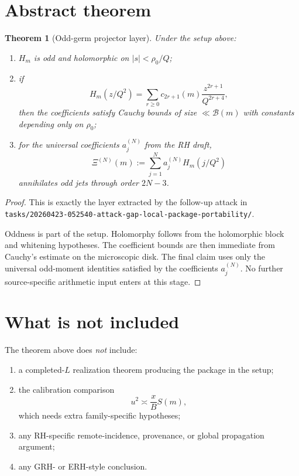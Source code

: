 \documentclass[11pt]{article}
\newtheorem{theorem}{Theorem}
\begin{document}
\section{Abstract theorem}

\begin{theorem}[Odd-germ projector layer]
Under the setup above:

\begin{enumerate}
\item \(H_m\) is odd and holomorphic on \(|s|<\rho_0/Q\);
\item if
\[
H_m(z/Q^2)=\sum_{r\ge 0} c_{2r+1}(m)\frac{z^{2r+1}}{Q^{2r+4}},
\]
then the coefficients satisfy Cauchy bounds of size \(\ll \mathcal B(m)\)
with constants depending only on \(\rho_0\);
\item for the universal coefficients \(a_j^{(N)}\) from the RH draft,
\[
\Xi^{(N)}(m):=\sum_{j=1}^N a_j^{(N)}H_m(j/Q^2)
\]
annihilates odd jets through order \(2N-3\).
\end{enumerate}
\end{theorem}

\begin{proof}
This is exactly the layer extracted by the follow-up attack in
\texttt{tasks/20260423-052540-attack-gap-local-package-portability/}.

Oddness is part of the setup. Holomorphy follows from the holomorphic block and
whitening hypotheses. The coefficient bounds are then immediate from Cauchy's
estimate on the microscopic disk. The final claim uses only the universal
odd-moment identities satisfied by the coefficients \(a_j^{(N)}\). No further
source-specific arithmetic input enters at this stage.
\end{proof}

\section{What is not included}

The theorem above does \emph{not} include:

\begin{enumerate}
\item a completed-\(L\) realization theorem producing the package in the setup;
\item the calibration comparison
\[
u^2\asymp \frac{x}{B}S(m),
\]
which needs extra family-specific hypotheses;
\item any RH-specific remote-incidence, provenance, or global propagation
argument;
\item any GRH- or ERH-style conclusion.
\end{enumerate}
\end{document}
